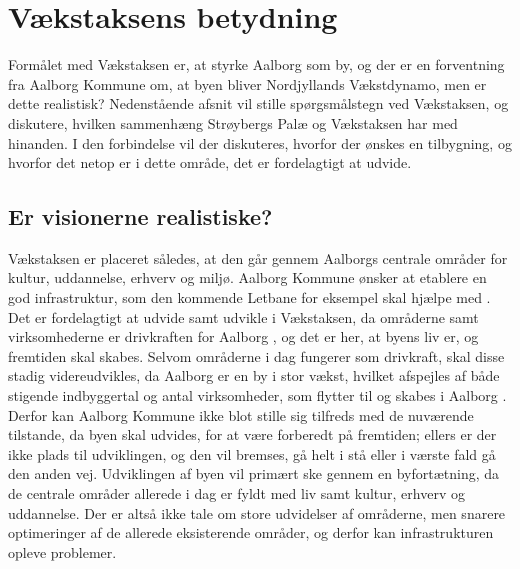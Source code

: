 \section{Vækstaksens betydning}
Formålet med Vækstaksen er, at styrke Aalborg som by, og der er en forventning fra Aalborg Kommune om, at byen bliver Nordjyllands Vækstdynamo, men er dette realistisk? Nedenstående afsnit vil stille spørgsmålstegn ved Vækstaksen, og diskutere, hvilken sammenhæng Strøybergs Palæ og Vækstaksen har med hinanden. I den forbindelse vil der diskuteres, hvorfor der ønskes en tilbygning, og hvorfor det netop er i dette område, det er fordelagtigt at udvide.

\subsection{Er visionerne realistiske?}
Vækstaksen er placeret således, at den går gennem Aalborgs centrale områder for kultur, uddannelse, erhverv og miljø.  Aalborg Kommune ønsker at etablere en god infrastruktur, som den kommende Letbane for eksempel skal hjælpe med \citep{kommuneplan3}. Det er fordelagtigt at udvide samt udvikle i Vækstaksen, da områderne samt virksomhederne er drivkraften for Aalborg \citep{bedreoverblik}, og det er her, at byens liv er, og fremtiden skal skabes. Selvom områderne i dag fungerer som drivkraft, skal disse stadig videreudvikles, da Aalborg er en by i stor vækst, hvilket afspejles af både stigende indbyggertal og antal virksomheder, som flytter til og skabes i Aalborg \citep{statistik}\citep{virksomheder}. Derfor kan Aalborg Kommune ikke blot stille sig tilfreds med de nuværende tilstande, da byen skal udvides, for at være forberedt på fremtiden; ellers er der ikke plads til udviklingen, og den vil bremses, gå helt i stå eller i værste fald gå den anden vej.
\newline \indent{     }  Udviklingen af byen vil primært ske gennem en byfortætning, da de centrale områder allerede i dag er fyldt med liv samt kultur, erhverv og uddannelse. Der er altså ikke tale om store udvidelser af områderne, men snarere optimeringer af de allerede eksisterende områder, og derfor kan infrastrukturen opleve problemer. 
